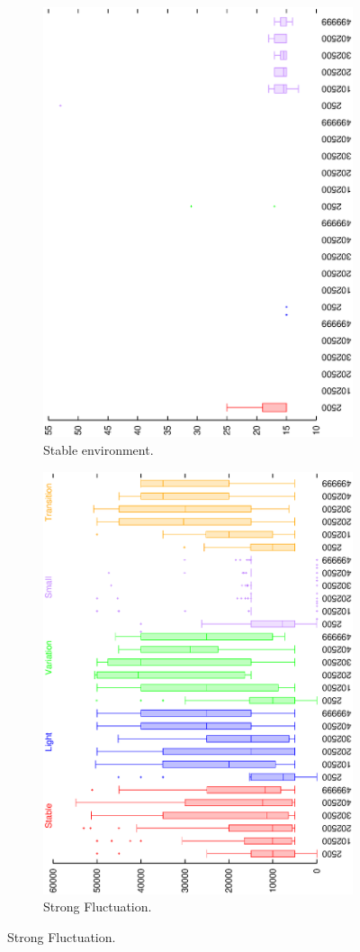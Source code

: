 \documentclass[letterpaper]{article}
\begin{document}
\begin{figure}[H]
\begin{subfigure}{.25\textwidth}
  \centering
  \includegraphics[width=.7\linewidth, angle =-90]{img/boxendingsFailedstable.eps}
  \caption{Stable environment.}
  \label{fig:sfig1}
\end{subfigure}%
\begin{subfigure}{.25\textwidth}
  \centering
  \includegraphics[width=.7\linewidth, angle =-90]{img/boxendingsFailedvariation.eps}
  \caption{Strong Fluctuation.}
  \label{fig:sfig2}
\end{subfigure}


\end{figure}
\end{document}
